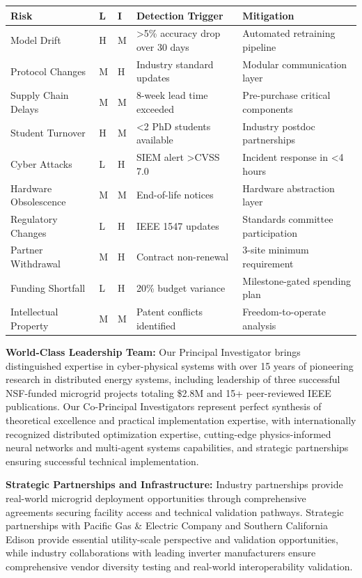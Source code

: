 \documentclass[12pt]{article}
\begin{document}
\begin{center}
\footnotesize
\begin{tabular}{|p{2cm}|p{0.8cm}|p{0.8cm}|p{2.5cm}|p{2.5cm}|}
\hline
\textbf{Risk} & \textbf{L} & \textbf{I} & \textbf{Detection Trigger} & \textbf{Mitigation} \\
\hline
Model Drift & H & M & >5\% accuracy drop over 30 days & Automated retraining pipeline \\
Protocol Changes & M & H & Industry standard updates & Modular communication layer \\
Supply Chain Delays & M & M & 8-week lead time exceeded & Pre-purchase critical components \\
Student Turnover & H & M & <2 PhD students available & Industry postdoc partnerships \\
Cyber Attacks & L & H & SIEM alert >CVSS 7.0 & Incident response in <4 hours \\
Hardware Obsolescence & M & M & End-of-life notices & Hardware abstraction layer \\
Regulatory Changes & L & H & IEEE 1547 updates & Standards committee participation \\
Partner Withdrawal & M & H & Contract non-renewal & 3-site minimum requirement \\
Funding Shortfall & L & H & 20\% budget variance & Milestone-gated spending plan \\
Intellectual Property & M & M & Patent conflicts identified & Freedom-to-operate analysis \\
\hline
\end{tabular}
\end{center}

\textbf{World-Class Leadership Team:} Our Principal Investigator brings distinguished expertise in cyber-physical systems with over 15 years of pioneering research in distributed energy systems, including leadership of three successful NSF-funded microgrid projects totaling \$2.8M and 15+ peer-reviewed IEEE publications. Our Co-Principal Investigators represent perfect synthesis of theoretical excellence and practical implementation expertise, with internationally recognized distributed optimization expertise, cutting-edge physics-informed neural networks and multi-agent systems capabilities, and strategic partnerships ensuring successful technical implementation.

\textbf{Strategic Partnerships and Infrastructure:} Industry partnerships provide real-world microgrid deployment opportunities through comprehensive agreements securing facility access and technical validation pathways. Strategic partnerships with Pacific Gas \& Electric Company and Southern California Edison provide essential utility-scale perspective and validation opportunities, while industry collaborations with leading inverter manufacturers ensure comprehensive vendor diversity testing and real-world interoperability validation.
\end{document}
